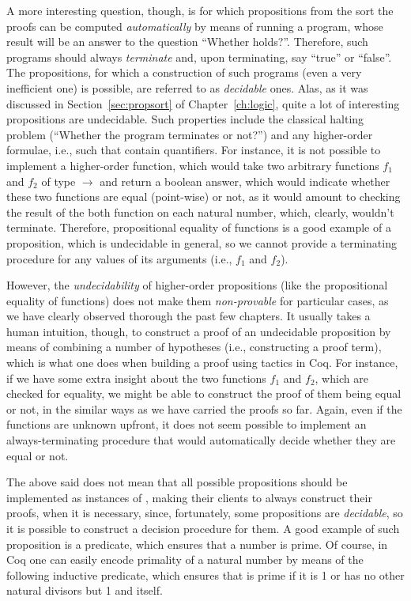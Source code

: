 A more interesting question, though, is for which propositions 
from the sort  the proofs can be computed \textit{automatically} by
means of running a program, whose result will be an answer to the
question ``Whether  holds?''. Therefore, such programs should always
\textit{terminate} and, upon terminating, say ``true'' or ``false''. The
propositions, for which a construction of such programs (even a very
inefficient one) is possible, are referred to 
as \textit{decidable} ones. Alas, as it was discussed in
Section~\ref{sec:propsort} of Chapter~\ref{ch:logic}, quite a lot of
interesting propositions are undecidable. Such properties include the
classical halting problem  (``Whether the
program  terminates or not?'') and any higher-order formulae, i.e.,
such that contain quantifiers. For instance, it is not possible to
implement a higher-order function, which would take two arbitrary
functions $f_1$ and $f_2$ of type  \ensuremath{\rightarrow}  and return a boolean
answer, which would indicate whether these two functions are equal
(point-wise) or not, as it would amount to checking the result of the
both function on each natural number, which, clearly, wouldn't
terminate. Therefore, propositional equality of functions is a good
example of a proposition, which is undecidable in general, so we
cannot provide a terminating procedure for any values of its arguments
(i.e., $f_1$ and $f_2$).


However, the \textit{undecidability} of higher-order propositions (like the
propositional equality of functions) does not make them \textit{non-provable}
for particular cases, as we have clearly observed thorough the past
few chapters. It usually takes a human intuition, though, to construct
a proof of an undecidable proposition by means of combining a number
of hypotheses (i.e., constructing a proof term), which is what one
does when building a proof using tactics in Coq. For instance, if we
have some extra insight about the two functions $f_1$ and $f_2$, which
are checked for equality, we might be able to construct the proof of
them being equal or not, in the similar ways as we have carried the
proofs so far. Again, even if the functions are unknown upfront, it
does not seem possible to implement an always-terminating procedure
that would automatically decide whether they are equal or not.


The above said does not mean that all possible propositions should be implemented as instances of , making their clients to always construct their proofs, when it is necessary, since, fortunately, some propositions are \textit{decidable}, so it is possible to construct a decision procedure for them. A good example of such proposition is a predicate, which ensures that a number  is prime. Of course, in Coq one can easily encode primality of a natural number by means of the following inductive predicate, which ensures that  is prime if it is 1 or has no other natural divisors but 1 and  itself.


